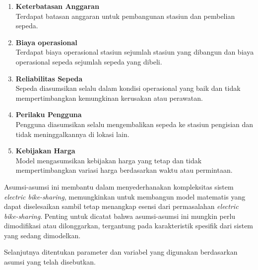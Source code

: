 \begin{enumerate}
    \item \textbf{Keterbatasan Anggaran}\\ Terdapat batasan anggaran untuk pembangunan stasiun dan pembelian sepeda.
    \item \textbf{Biaya operasional}\\ Terdapat biaya operasional stasiun sejumlah stasiun yang dibangun dan biaya operasional sepeda sejumlah sepeda yang dibeli.
    \item \textbf{Reliabilitas Sepeda}\\ Sepeda diasumsikan selalu dalam kondisi operasional yang baik dan tidak mempertimbangkan kemungkinan kerusakan atau perawatan.
    \item \textbf{Perilaku Pengguna}\\ Pengguna diasumsikan selalu mengembalikan sepeda ke stasiun pengisian dan tidak meninggalkannya di lokasi lain.
    \item \textbf{Kebijakan Harga}\\ Model mengasumsikan kebijakan harga yang tetap dan tidak mempertimbangkan variasi harga berdasarkan waktu atau permintaan.
\end{enumerate}

Asumsi-asumsi ini membantu dalam menyederhanakan kompleksitas sistem \textit{electric bike-sharing}, memungkinkan untuk membangun model matematis yang dapat diselesaikan sambil tetap menangkap esensi dari permasalahan \textit{electric bike-sharing}. Penting untuk dicatat bahwa asumsi-asumsi ini mungkin perlu dimodifikasi atau dilonggarkan, tergantung pada karakteristik spesifik dari sistem yang sedang dimodelkan.

Selanjutnya ditentukan parameter dan variabel yang digunakan berdasarkan asumsi yang telah disebutkan.

